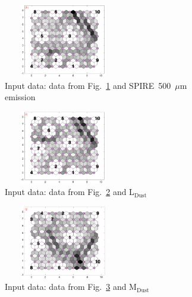 \begin{figure}
\begin{subfigure}[b]{0.25\textwidth}
        \label{fig: col3and17_dist}
    \end{subfigure}
        \hfill
    \begin{subfigure}[b]{0.25\textwidth}
        \centering
        \includegraphics[width=52mm, height=32mm]{../../images0.01/M31/2D/diff_dimension/combine_2D_data_between_cols3and18.png}
        \captionsetup{font=tiny}
        \caption{Input data: data from Fig.~\ref{fig: col3and17_dist} and SPIRE~500~$\mu$m emission} 
        \label{fig: col3and18_dist}
    \end{subfigure}
        \hfill
    \begin{subfigure}[b]{0.25\textwidth}
        \centering
        \includegraphics[width=52mm, height=32mm]{../../images0.01/M31/2D/diff_dimension/combine_2D_data_between_cols3and19.png}
         \captionsetup{font=tiny}
        \caption{Input data: data from Fig.~\ref{fig: col3and18_dist} and L$_{\mathrm{ Dust}}$} 
        \label{fig: col3and19_dist}
    \end{subfigure}
        \hfill
    \begin{subfigure}[b]{0.25\textwidth}
        \centering
        \includegraphics[width=52mm, height=32mm]{../../images0.01/M31/2D/diff_dimension/combine_2D_data_between_cols3and20.png}
          \captionsetup{font=tiny}
        \caption{Input data: data from Fig.~\ref{fig: col3and19_dist} and M$_{\mathrm{ Dust}}$} 
        \label{fig: col3and20_dist}
    \end{subfigure}        \hfill
    \begin{subfigure}[b]{0.25\textwidth}

\end{subfigure}
\end{figure}
